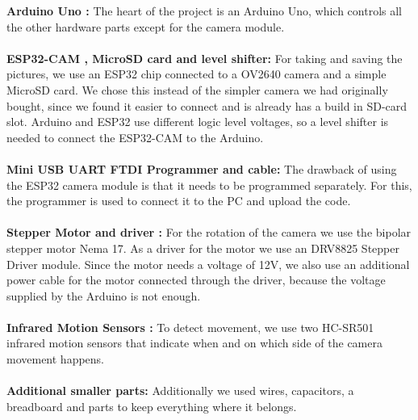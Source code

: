\documentclass{article}
\begin{document}
\textbf{Arduino Uno \cite{arduino}:} The heart of the project is an Arduino Uno, which controls all the other hardware parts except for the camera module.\\
\\
\textbf{ESP32-CAM \cite{esp32cam}, MicroSD card and level shifter:} For taking and saving the pictures, we use an ESP32 chip connected to a OV2640 camera and a simple MicroSD card. We chose this instead of the simpler camera we had originally bought, since we found it easier to connect and is already has a build in SD-card slot. Arduino and ESP32 use different logic level voltages, so a level shifter is needed to connect the ESP32-CAM to the Arduino.\\
\\
\textbf{Mini USB UART FTDI Programmer \cite{programmer} and cable:} The drawback of using the ESP32 camera module is that it needs to be programmed separately. For this, the programmer is used to connect it to the PC and upload the code.\\
\\
\textbf{Stepper Motor \cite{stepperMotor} and driver \cite{driver}:} For the rotation of the camera we use the bipolar stepper motor Nema 17. As a driver for the motor we use an DRV8825 Stepper Driver module. Since the motor needs a voltage of 12V, we also use an additional power cable for the motor connected through the driver, because the voltage supplied by the Arduino is not enough.\\
\\
\textbf{Infrared Motion Sensors  \cite{sensors}:} To detect movement, we use two HC-SR501 infrared motion sensors that indicate when and on which side of the camera movement happens.\\
\\
\textbf{Additional smaller parts:} Additionally we used wires, capacitors, a breadboard and parts to keep everything where it belongs.

\newpage
\end{document}

